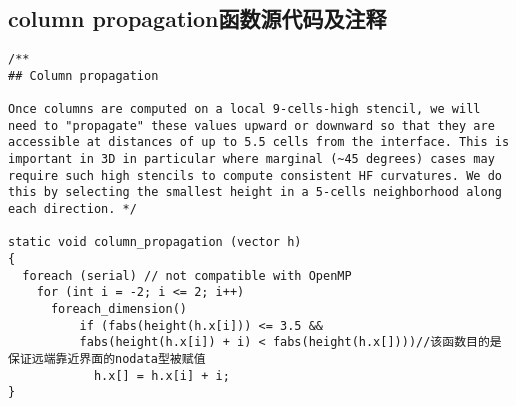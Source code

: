 \documentclass[lang=cn,11pt,a4paper]{elegantpaper}
\begin{document}
\subsection{column propagation函数源代码及注释}
\begin{verbatim}
/**
## Column propagation

Once columns are computed on a local 9-cells-high stencil, we will
need to "propagate" these values upward or downward so that they are
accessible at distances of up to 5.5 cells from the interface. This is
important in 3D in particular where marginal (~45 degrees) cases may
require such high stencils to compute consistent HF curvatures. We do
this by selecting the smallest height in a 5-cells neighborhood along
each direction. */

static void column_propagation (vector h)
{
  foreach (serial) // not compatible with OpenMP
    for (int i = -2; i <= 2; i++)
      foreach_dimension()
          if (fabs(height(h.x[i])) <= 3.5 &&
          fabs(height(h.x[i]) + i) < fabs(height(h.x[])))//该函数目的是保证远端靠近界面的nodata型被赋值
            h.x[] = h.x[i] + i;
}
\end{verbatim}
\printbibliography[heading=bibintoc, title=\ebibname]
\end{document}
